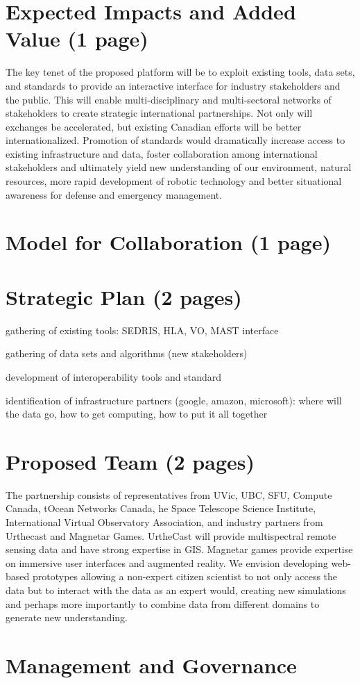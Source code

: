 \documentclass[pdftex,12pt]{article}
\begin{document}
\section{Expected Impacts and Added Value  (1 page)}

The key tenet of the proposed platform will be to exploit existing
tools, data sets, and standards to provide an interactive interface
for industry stakeholders and the public.  This will enable
multi-disciplinary and multi-sectoral networks of stakeholders to
create strategic international partnerships. Not only will exchanges
be accelerated, but existing Canadian efforts will be better
internationalized.  Promotion of standards would dramatically increase
access to existing infrastructure and data, foster collaboration among
international stakeholders and ultimately yield new understanding of
our environment, natural resources, more rapid development of robotic
technology and better situational awareness for defense and emergency
management.

\section{Model for Collaboration (1 page)}

\section{Strategic Plan (2 pages)}

gathering of existing tools: SEDRIS, HLA, VO, MAST interface

gathering of data sets and algorithms (new stakeholders)

development of interoperability tools and standard

identification of infrastructure partners (google, amazon, microsoft):
where will the data go, how to get computing, how to put it all together

\section{Proposed Team (2 pages)}

The partnership consists of representatives from UVic, UBC, SFU,
Compute Canada, tOcean Networks Canada, he Space Telescope Science
Institute, International Virtual Observatory Association, and industry
partners from Urthecast and Magnetar Games.  UrtheCast will provide
multispectral remote sensing data and have strong expertise in GIS.
Magnetar games provide expertise on immersive user interfaces and
augmented reality.  We envision developing web-based prototypes
allowing a non-expert citizen scientist to not only access the data
but to interact with the data as an expert would, creating new
simulations and perhaps more importantly to combine data from
different domains to generate new understanding.

\section{ Management and Governance }
\end{document}
